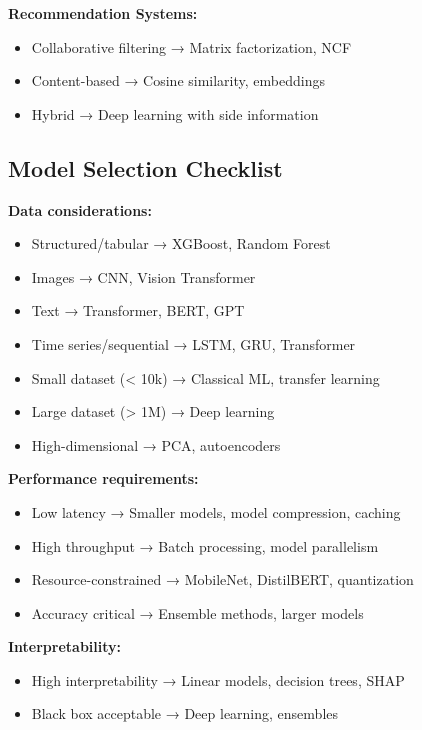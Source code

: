 \documentclass[8pt,landscape]{article}
\begin{document}
\begin{multicols}{3}
\textbf{Recommendation Systems:}
\begin{itemize}
\item Collaborative filtering → Matrix factorization, NCF
\item Content-based → Cosine similarity, embeddings
\item Hybrid → Deep learning with side information
\end{itemize}

\subsection*{Model Selection Checklist}

\textbf{Data considerations:}
\begin{itemize}
\item Structured/tabular → XGBoost, Random Forest
\item Images → CNN, Vision Transformer
\item Text → Transformer, BERT, GPT
\item Time series/sequential → LSTM, GRU, Transformer
\item Small dataset (< 10k) → Classical ML, transfer learning
\item Large dataset (> 1M) → Deep learning
\item High-dimensional → PCA, autoencoders
\end{itemize}

\textbf{Performance requirements:}
\begin{itemize}
\item Low latency → Smaller models, model compression, caching
\item High throughput → Batch processing, model parallelism
\item Resource-constrained → MobileNet, DistilBERT, quantization
\item Accuracy critical → Ensemble methods, larger models
\end{itemize}

\textbf{Interpretability:}
\begin{itemize}
\item High interpretability → Linear models, decision trees, SHAP
\item Black box acceptable → Deep learning, ensembles
\end{itemize}

\end{multicols}
\end{document}
